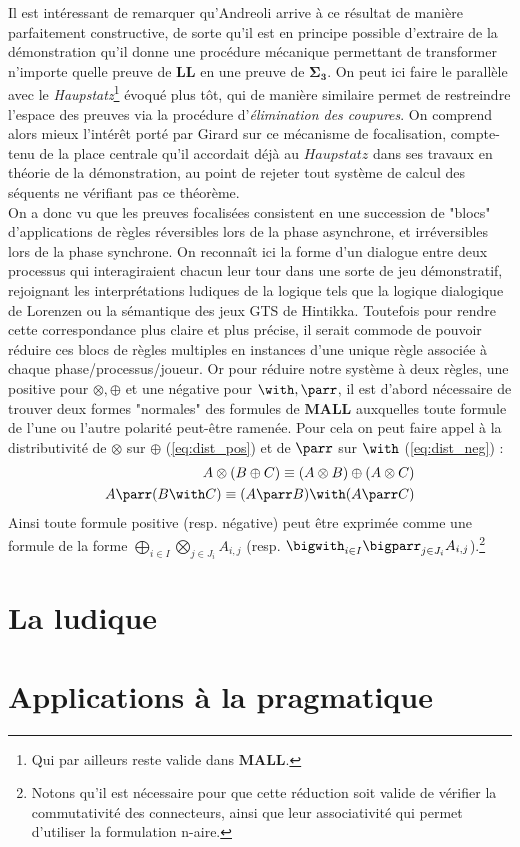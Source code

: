 \documentclass[12pt]{report}
\begin{document}
Il est intéressant de remarquer qu'Andreoli arrive à ce résultat de manière parfaitement constructive, de sorte qu'il est en principe possible d'extraire de la démonstration qu'il donne une procédure mécanique permettant de transformer n'importe quelle preuve de $\mathbf{LL}$ en une preuve de $\bm{\Sigma}_{\mathbf{3}}$. On peut ici faire le parallèle avec le \textit{Haupstatz}\footnote{Qui par ailleurs reste valide dans $\mathbf{MALL}$.} évoqué plus tôt, qui de manière similaire permet de restreindre l'espace des preuves via la procédure d'\emph{élimination des coupures}. On comprend alors mieux l'intérêt porté par Girard sur ce mécanisme de focalisation, compte-tenu de la place centrale qu'il accordait déjà au $Haupstatz$ dans ses travaux en théorie de la démonstration, au point de rejeter tout système de calcul des séquents ne vérifiant pas ce théorème.\\

On a donc vu que les preuves focalisées consistent en une succession de "blocs" d'applications de règles réversibles lors de la phase asynchrone, et irréversibles lors de la phase synchrone. On reconnaît ici la forme d'un dialogue entre deux processus qui interagiraient chacun leur tour dans une sorte de jeu démonstratif, rejoignant les interprétations ludiques de la logique tels que la logique dialogique de Lorenzen ou la sémantique des jeux GTS de Hintikka. Toutefois pour rendre cette correspondance plus claire et plus précise, il serait commode de pouvoir réduire ces blocs de règles multiples en instances d'une unique règle associée à chaque phase/processus/joueur. Or pour réduire notre système à deux règles, une positive pour $\otimes,\oplus$ et une négative pour $\with,\parr$, il est d'abord nécessaire de trouver deux formes "normales" des formules de $\mathbf{MALL}$ auxquelles toute formule de l'une ou l'autre polarité peut-être ramenée. Pour cela on peut faire appel à la distributivité de $\otimes$ sur $\oplus$ (\ref{eq:dist_pos}) et de $\parr$ sur $\with$ (\ref{eq:dist_neg}) :
\begin{align}
A \otimes (B \oplus C) \equiv (A \otimes B) \oplus (A \otimes C) \label{eq:dist_pos} \\
A \parr (B \with C) \equiv (A \parr B) \with (A \parr C) \label{eq:dist_neg}
\end{align}
Ainsi toute formule positive (resp. négative) peut être exprimée comme une formule de la forme $\bigoplus_{i \in I}\bigotimes_{j \in J_i}A_{i,j}$ (resp. $\bigwith_{i \in I}\bigparr_{j \in J_i}A_{i,j}$).\footnote{Notons qu'il est nécessaire pour que cette réduction soit valide de vérifier la commutativité des connecteurs, ainsi que leur associativité qui permet d'utiliser la formulation n-aire.}

\chapter{La ludique}

\chapter{Applications à la pragmatique}

\nocite{Tai68}
\nocite{Lec11}
\nocite{Gir03}
\nocite{Gir06}



\end{document}
